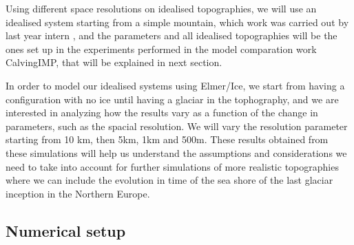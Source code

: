 \documentclass[a4paper,12pt]{article}
\begin{document}
Using different space resolutions on idealised topographies, we will use an idealised system starting from a simple mountain, which work was carried out by last year intern \cite{Dainche2022}, and the parameters and all idealised topographies will be the ones set up in the experiments performed in the model comparation work CalvingIMP, that will be explained in next section. 

In order to model our idealised systems using Elmer/Ice, we start from having a configuration with no ice until having a glaciar in the tophography, and we are interested in analyzing how the results vary as a function of the change in parameters, such as the spacial resolution. We will vary the resolution parameter starting from 10 km, then 5km, 1km and 500m. These results obtained from these simulations will help us understand the assumptions and considerations we need to take into account for further simulations of more realistic topographies where we can include the evolution in time of the sea shore of the last  glaciar inception in the Northern Europe.

\subsection{Numerical setup}
\end{document}
